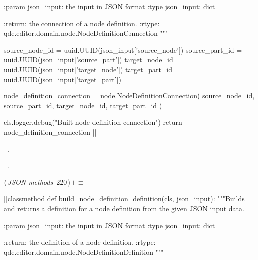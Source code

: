 \documentclass[%
    a4paper,    %
    justified,  %
    nobib,      %
    openany     %
]{tufte-book}
\makeatletter
\renewcommand{\label}[1]{\@tufte@label{##1}}%
\makeatother
\begin{document}
\begin{fullwidth}
\begin{flushleft}
\begin{minipage}{\linewidth}
\begin{pythoncode}
    :param json_input: the input in JSON format
    :type  json_input: dict

    :return: the connection of a node definition.
    :rtype:  qde.editor.domain.node.NodeDefinitionConnection
    """

    source_node_id = uuid.UUID(json_input['source_node'])
    source_part_id = uuid.UUID(json_input['source_part'])
    target_node_id = uuid.UUID(json_input['target_node'])
    target_part_id = uuid.UUID(json_input['target_part'])

    node_definition_connection = node.NodeDefinitionConnection(
        source_node_id,
        source_part_id,
        target_node_id,
        target_part_id
    )

    cls.logger.debug("Built node definition connection")
    return node_definition_connection
|\NWsep|
\end{pythoncode}
\vspace{1.5ex}
\footnotesize
\begin{list}{}{\setlength{\itemsep}{-\parsep}\setlength{\itemindent}{-\leftmargin}}
\item \NWtxtMacroDefBy\ .
\item \NWtxtMacroRefIn\ .

\item{}
\end{list}
\end{minipage}\vspace{4ex}
\end{flushleft}
\begin{flushleft} \small
\begin{minipage}{\linewidth}\label{scrap225}\raggedright\small
{} $\langle\,${\itshape JSON methods}\nobreak\ {\footnotesize {220}}$\,\rangle+\equiv$
\vspace{-1ex}
\begin{pythoncode}
|\normalfont{}\fontfamily{}|classmethod
def build_node_definition_definition(cls, json_input):
    """Builds and returns a definition for a node definition from the given
    JSON input data.

    :param json_input: the input in JSON format
    :type  json_input: dict

    :return: the definition of a node definition.
    :rtype:  qde.editor.domain.node.NodeDefinitionDefinition
    """


\end{pythoncode}
\end{minipage}
\end{flushleft}
\end{fullwidth}
\end{document}
